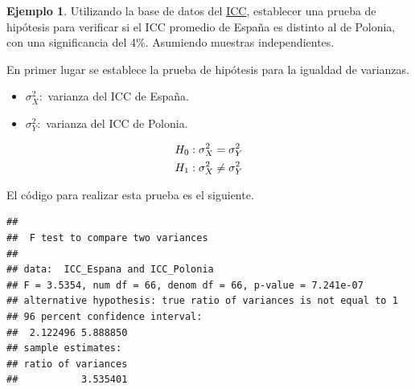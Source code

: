 \documentclass[
  11pt,
]{book}
\newenvironment{Shaded}{\begin{snugshade}}{\end{snugshade}}
\newcommand{\AttributeTok}[1]{\textcolor[rgb]{0.13,0.29,0.53}{#1}}
\newcommand{\CommentTok}[1]{\textcolor[rgb]{0.56,0.35,0.01}{\textit{#1}}}
\newcommand{\FloatTok}[1]{\textcolor[rgb]{0.00,0.00,0.81}{#1}}
\newcommand{\FunctionTok}[1]{\textcolor[rgb]{0.13,0.29,0.53}{\textbf{#1}}}
\newcommand{\NormalTok}[1]{#1}
\newcommand{\OtherTok}[1]{\textcolor[rgb]{0.56,0.35,0.01}{#1}}
\newcommand{\SpecialCharTok}[1]{\textcolor[rgb]{0.81,0.36,0.00}{\textbf{#1}}}
\newcommand{\StringTok}[1]{\textcolor[rgb]{0.31,0.60,0.02}{#1}}
\providecommand{\tightlist}{%
  \setlength{\itemsep}{0pt}\setlength{\parskip}{0pt}}
\theoremstyle{definition}
\theoremstyle{definition}
\newtheorem{example}{Ejemplo}[chapter]
\theoremstyle{definition}
\theoremstyle{definition}
\theoremstyle{remark}
\begin{document}
\begin{example}

Utilizando la base de datos del \hyperref[ICC]{ICC}, establecer una prueba de hipótesis para verificar si el ICC promedio de España es distinto al de Polonia, con una significancia del 4\%. Asumiendo muestras independientes.

En primer lugar se establece la prueba de hipótesis para la igualdad de varianzas.

\begin{itemize}
\tightlist
\item
  \(\sigma^2_X:\) varianza del ICC de España.
\item
  \(\sigma^2_Y:\) varianza del ICC de Polonia.
\end{itemize}

\begin{equation}
\notag
  \begin{split}
    H_0&: \sigma^2_{X} = \sigma^2_{Y}\\
    H_1&: \sigma^2_{X} \neq \sigma^2_{Y}\\
  \end{split}
\end{equation}

El código para realizar esta prueba es el siguiente.

\begin{Shaded}
\end{Shaded}

\begin{verbatim}
## 
##  F test to compare two variances
## 
## data:  ICC_Espana and ICC_Polonia
## F = 3.5354, num df = 66, denom df = 66, p-value = 7.241e-07
## alternative hypothesis: true ratio of variances is not equal to 1
## 96 percent confidence interval:
##  2.122496 5.888850
## sample estimates:
## ratio of variances 
##           3.535401
\end{verbatim}


\end{example}
\end{document}
